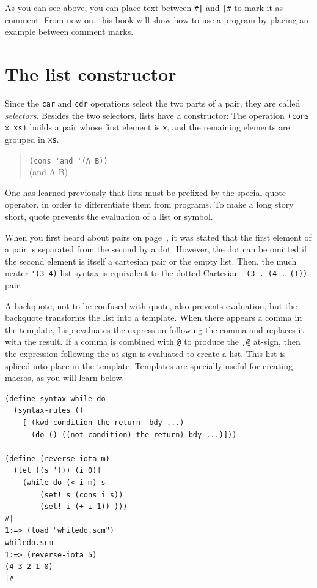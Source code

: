 \documentclass[a4paper,12pt]{book}
\begin{document}
As you can see above, you can place text between
\verb/#|/ and \verb/|#/ to mark it as comment.
From now on, this book will show how to use a
program by placing an example between comment marks.

\section{The list constructor}
Since the \verb|car| and \verb|cdr| operations
select the two parts of a pair, they are called
{\em selectors}.
Besides the two selectors, lists have a
constructor: The operation \verb|(cons x xs)| builds a pair
whose first element is \verb|x|, and the 
remaining elements are grouped in \verb|xs|.

\begin{quote}
\verb|(cons 'and '(A B))|\\
(and A B)
\end{quote}

One has learned previously that lists must be
prefixed by the special quote operator,
in order to differentiate them from programs.
To make a long story short, quote  prevents
the evaluation of a list or symbol.

When you first heard about pairs on
page~\pageref{page:cartesian-pair},
it was stated that the first element
of a pair is separated from the 
second by a dot. However, the dot
can be omitted if the second element
is itself a cartesian pair or
the empty list. Then,
the  much neater 
\verb|'(3 4)| list syntax is equivalent 
to the dotted Cartesian \verb|'(3 . (4 . ()))| pair.

A backquote, not to be confused with quote, also prevents
evaluation, but the backquote transforms the list 
into a template.
When there appears a comma in the 
template, Lisp evaluates the expression following
the comma
and replaces it with the result. 
If a comma is combined with \verb|@| to produce
the \verb|,@| at-sign,
then the expression following the at-sign 
is evaluated to create a list. This list is
spliced into place in the template. 
Templates are specially useful for creating
macros, as you will learn below.

\begin{verbatim}
(define-syntax while-do 
  (syntax-rules ()
    [ (kwd condition the-return  bdy ...)
      (do () ((not condition) the-return) bdy ...)]))

(define (reverse-iota m)
  (let [(s '()) (i 0)]
    (while-do (< i m) s
	    (set! s (cons i s))
	    (set! i (+ i 1)) )))
#|
1:=> (load "whiledo.scm")
whiledo.scm
1:=> (reverse-iota 5)
(4 3 2 1 0)
|#
\end{verbatim}
\end{document}
